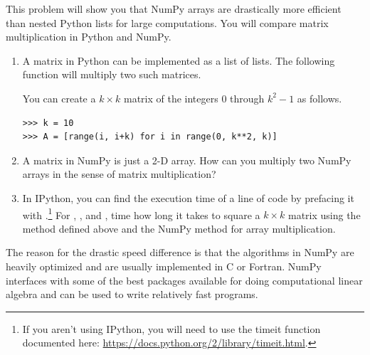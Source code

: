 \begin{problem}
This problem will show you that NumPy arrays are drastically more efficient than nested Python lists for large computations. You will compare matrix multiplication in Python and NumPy.
\begin{enumerate}
\item A matrix in Python can be implemented as a list of lists. The following function will multiply two such matrices.



You can create a $k \times k$ matrix  of the integers 0 through $k^2-1$ as follows.

\begin{lstlisting}
>>> k = 10 
>>> A = [range(i, i+k) for i in range(0, k**2, k)]
\end{lstlisting}

\item A matrix in NumPy is just a 2-D array. How can you multiply two NumPy arrays in the sense of matrix multiplication?

\item In IPython, you can find the execution time of a line of code by prefacing it with .\footnote{If you aren't using IPython, you will need
to use the timeit function documented here: \url{https://docs.python.org/2/library/timeit.html}.} For , , and , time how long it takes to square a $k \times k$ matrix using the method  defined above and the NumPy method for array multiplication.
% 
% 
% 
\end{enumerate}

The reason for the drastic speed difference is that the algorithms in NumPy are heavily optimized and
are usually implemented in C or Fortran. NumPy interfaces with some of the best packages
available for doing computational linear algebra and can be used to
write relatively fast programs.
\end{problem}

